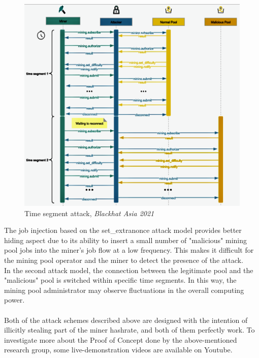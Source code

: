 \begin{figure}[h!]
    \centering
    \includegraphics[width=15cm]{Figures/stratum/stratum6.png}
    \caption{Time segment attack, \textit{Blackhat Asia 2021}}
    \label{fig:stratum6}
\end{figure}

\noindent The job injection based on the set\_extranonce attack model provides better hiding aspect due to its ability to insert a small number of "malicious" mining pool jobs into the miner's job flow at a low frequency. This makes it difficult for the mining pool operator and the miner to detect the presence of the attack.\\
In the second attack model, the connection between the legitimate pool and the "malicious" pool is switched within specific time segments. In this way, the mining pool administrator may observe fluctuations in the overall computing power.\\\\
Both of the attack schemes described above are designed with the intention of illicitly stealing part of the miner hashrate, and both of them perfectly work.
To investigate more about the Proof of Concept done by the above-mentioned research group, some live-demonstration videos are available on Youtube. \cite{jobinjection}